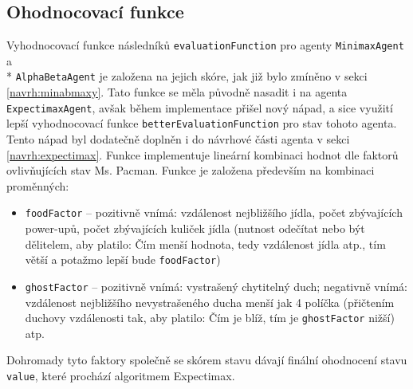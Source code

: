\subsection*{Ohodnocovací funkce}
Vyhodnocovací funkce následníků \texttt{evaluationFunction} pro agenty \texttt{MinimaxAgent} a \\* \texttt{AlphaBetaAgent} je založena na jejich skóre, jak již bylo zmíněno v sekci \ref{navrh:minabmaxy}. Tato funkce se měla původně nasadit i na agenta \texttt{ExpectimaxAgent}, avšak během implementace přišel nový nápad, a sice využití lepší vyhodnocovací funkce \texttt{betterEvaluationFunction} pro stav tohoto agenta. Tento nápad byl dodatečně doplněn i do návrhové části agenta v sekci \ref{navrh:expectimax}. Funkce implementuje lineární kombinaci hodnot dle faktorů ovlivňujících stav Ms. Pacman. Funkce je založena především na kombinaci proměnných:
\begin{itemize}
  \item \texttt{foodFactor} -- pozitivně vnímá: vzdálenost nejbližšího jídla, počet zbývajících power-upů, počet zbývajících kuliček jídla (nutnost odečítat nebo být dělitelem, aby platilo: Čím menší hodnota, tedy vzdálenost jídla atp., tím větší a potažmo lepší bude \texttt{foodFactor}) 
  \item \texttt{ghostFactor} -- pozitivně vnímá: vystrašený chytitelný duch; negativně vnímá: vzdálenost nejbližšího nevystrašeného ducha menší jak 4 políčka (přičtením duchovy vzdálenosti tak, aby platilo: Čím je blíž, tím je \texttt{ghostFactor} nižší) atp.
\end{itemize}
Dohromady tyto faktory společně se skórem stavu dávají finální ohodnocení stavu \texttt{value}, které prochází algoritmem Expectimax.

